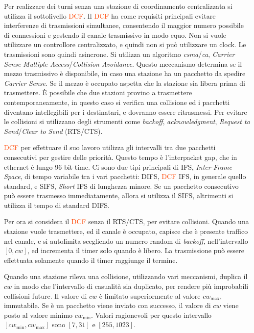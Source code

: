 \documentclass{article}
\numberwithin{equation}{subsection}
\begin{document}
Per realizzare dei turni senza una stazione di coordinamento centralizzata si utilizza il sottolivello \textcolor{OrangeRed}{DCF}. Il \textcolor{OrangeRed}{DCF} ha come requisiti principali evitare interferenze di 
trasmissioni simultanee, consentendo il maggior numero possibile di connessioni e gestendo il canale trasmissivo in modo equo. Non si vuole utilizzare un controllore 
centralizzato, e quindi non si può utilizzare un clock. Le trasmissioni sono quindi asincrone. 
Si utilizza un algoritmo \textit{csma}/\textit{ca}, \textit{Carrier Sense Multiple Access}/\textit{Collision Avoidance}. Questo meccanismo determina se il mezzo trasmissivo è disponibile, in caso 
una stazione ha un pacchetto da spedire \textit{Carrier Sense}. Se il mezzo è occupato aspetta che la stazione sia libera prima di trasmettere. 
\`{E} possibile che due stazioni provino a trasmettere contemporaneamente, in questo caso si verifica una collisione ed i pacchetti diventano intellegibili per 
i destinatari, e dovranno essere ritrasmessi. Per evitare le collisioni si utilizzano degli strumenti come \textit{backoff}, \textit{acknowledgment}, \textit{Request to Send}/\textit{Clear to Send} (\textcolor{Dandelion}{RTS}/\textcolor{Dandelion}{CTS}). 

\textcolor{OrangeRed}{DCF} per effettuare il suo lavoro utilizza gli intervalli tra due pacchetti consecutivi per gestire delle priorità. Questo tempo è l'interpacket gap, che in ethernet 
è lungo 96 bit-time. Ci sono due tipi principali di IFS, \textit{Inter-Frame Space}, di tempo variabile tra i vari pacchetti: DIFS, \textcolor{OrangeRed}{DCF} IFS, in generale quello standard, e 
SIFS, \textit{Short} IFS di lunghezza minore. 
Se un pacchetto consecutivo può essere trasmesso immediatamente, allora si utilizza il SIFS, altrimenti si utilizza il tempo di standard DIFS. 


Per ora si considera il \textcolor{OrangeRed}{DCF} senza il \textcolor{Dandelion}{RTS}/\textcolor{Dandelion}{CTS}, per evitare collisioni.  
Quando una stazione vuole trasmettere, ed il canale è occupato, capisce che è presente traffico nel canale, e si autolimita scegliendo un numero random di \textit{backoff}, 
nell'intervallo $[0,cw]$, ed incrementa il timer solo quando è libero. La trasmissione può essere effettuata solamente quando il timer raggiunge il termine. 

Quando una stazione rileva una collisione, utilizzando vari meccanismi, duplica il $cw$ in modo che l'intervallo di casualità sia duplicato, per rendere più 
improbabili collisioni future. Il valore di $cw$ è limitato superiormente al valore $cw_{\max}$, immutabile. Se è un pacchetto viene inviato con successo, il valore di $cw$ viene posto al 
valore minimo $cw_{\min}$. 
Valori ragionevoli per questo intervallo $[cw_{\min},cw_{\max}]$ sono $[7,31]$ e $[255, 1023]$. 
\end{document}
